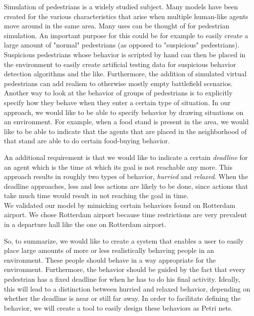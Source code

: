 \documentclass[11pt]{book}
\begin{document}
Simulation of pedestrians is a widely studied subject. Many models have been created for the various characteristics that arise when multiple human-like agents move around in the same area. Many uses can be thought of for pedestrian simulation. An important purpose for this could be for example to easily create a large amount of "normal" pedestrians (as opposed to "suspicious" pedestrians).  Suspicious pedestrians whose behavior is scripted by hand can then be placed in the environment to easily create artificial testing data for suspicious behavior detection algorithms and the like. Furthermore, the addition of simulated virtual pedestrians can add realism to otherwise mostly empty battlefield scenarios.\\
Another way to look at the behavior of groups of pedestrians is to explicitly specify how they behave when they enter a certain type of situation. In our approach, we would like to be able to specify behavior by drawing situations on an environment. For example, when a food stand is present in the area, we would like to be able to indicate that the agents that are placed in the neighborhood of that stand are able to do certain food-buying behavior.

An additional requirement is that we would like to indicate a certain \emph{deadline} for an agent which is the time at which its goal is not reachable any more. This approach results in roughly two types of behavior, \emph{hurried} and \emph{relaxed}. When the deadline approaches, less and less actions are likely to be done, since actions that take much time would result in not reaching the goal in time.\\
We validated our model by mimicking certain behaviors found on Rotterdam airport. We chose Rotterdam airport because time restrictions are very prevalent in a departure hall like the one on Rotterdam airport. 

So, to summarize, we would like to create a system that enables a user to easily place large amounts of more or less realistically behaving people in an environment. These people should behave in a way appropriate for the environment. Furthermore, the behavior should be guided by the fact that every pedestrian has a fixed deadline for when he has to do his final activity. Ideally, this will lead to a distinction between hurried and relaxed behavior, depending on whether the deadline is near or still far away. In order to facilitate defining the behavior, we will create a tool to easily design these behaviors as Petri nets. 
\end{document}
